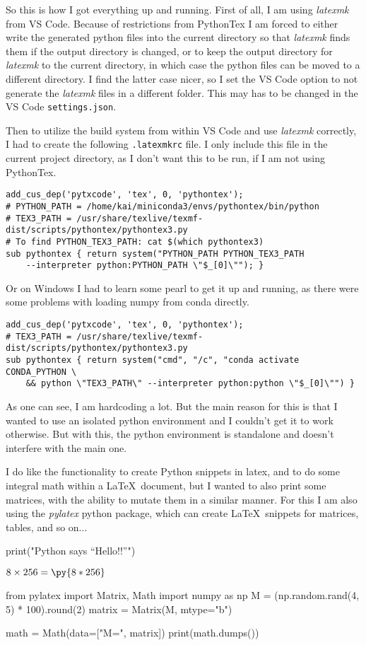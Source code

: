 \documentclass{article}
\newcommand{\pymultiply}[2]{\py{#1*#2}}
\begin{document}
So this is how I got everything up and running.
First of all, I am using \emph{latexmk} from VS Code.
Because of restrictions from PythonTex I am forced to
either write the generated python files into the current
directory so that \emph{latexmk} finds them if the output directory
is changed, or to keep the output directory for \emph{latexmk}
to the current directory, in which case the python files can be
moved to a different directory. I find the latter case nicer,
so I set the VS Code option to not generate the \emph{latexmk} 
files in a different folder. This may has to be changed
in the VS Code \texttt{settings.json}.

Then to utilize the build system from within VS Code and use
\emph{latexmk} correctly, I had to create the following
\texttt{.latexmkrc} file. I only include this file in the
current project directory, as I don't want this to be run, if
I am not using PythonTex.

{\small
\begin{verbatim}
add_cus_dep('pytxcode', 'tex', 0, 'pythontex');
# PYTHON_PATH = /home/kai/miniconda3/envs/pythontex/bin/python
# TEX3_PATH = /usr/share/texlive/texmf-dist/scripts/pythontex/pythontex3.py
# To find PYTHON_TEX3_PATH: cat $(which pythontex3)
sub pythontex { return system("PYTHON_PATH PYTHON_TEX3_PATH 
    --interpreter python:PYTHON_PATH \"$_[0]\""); }
\end{verbatim}
}

Or on Windows I had to learn some pearl to get it up and running,
as there were some problems with loading numpy from conda directly.

{\small
\begin{verbatim}
add_cus_dep('pytxcode', 'tex', 0, 'pythontex');
# TEX3_PATH = /usr/share/texlive/texmf-dist/scripts/pythontex/pythontex3.py
sub pythontex { return system("cmd", "/c", "conda activate CONDA_PYTHON \
    && python \"TEX3_PATH\" --interpreter python:python \"$_[0]\"") }
\end{verbatim}
}

As one can see, I am hardcoding a lot. But the main reason for this
is that I wanted to use an isolated python environment and
I couldn't get it to work otherwise. But with this, the
python environment is standalone and doesn't interfere with the
main one.

I do like the functionality to create Python snippets in latex, and
to do some integral math within a \LaTeX\ document, but I wanted
to also print some matrices, with the ability to mutate them
in a similar manner. For this I am also using the
\emph{pylatex} python package, which can create \LaTeX\ snippets
for matrices, tables, and so on...


\begin{pycode}
print("Python says ``Hello!!''")
\end{pycode}

$8 \times 256 = \pymultiply{8}{256}$

\begin{pycode}
from pylatex import Matrix, Math
import numpy as np
M = (np.random.rand(4, 5) * 100).round(2)
matrix = Matrix(M, mtype="b")

math = Math(data=["M=", matrix])
print(math.dumps())
\end{pycode}
\end{document}
